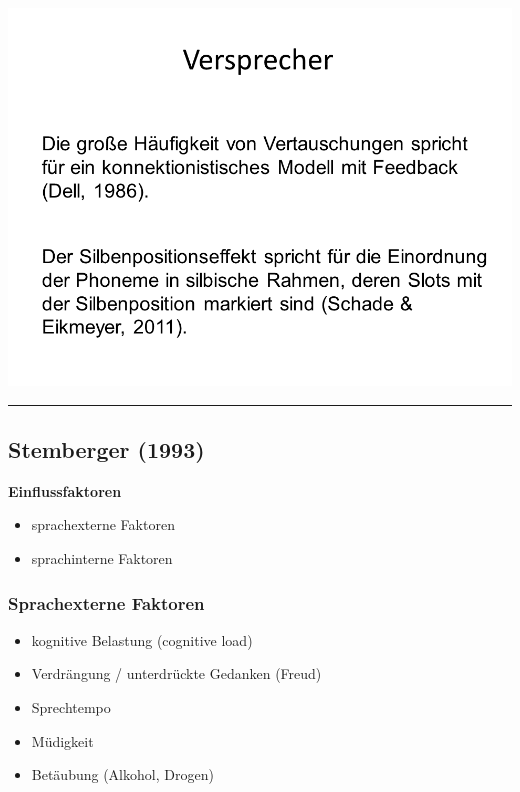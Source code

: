\documentclass[
  letterpaper,
]{scrbook}
\providecommand{\tightlist}{%
  \setlength{\itemsep}{0pt}\setlength{\parskip}{0pt}}\usepackage{longtable,booktabs,array}
\begin{document}
\includegraphics[width=1\textwidth,height=\textheight]{./pictures/Versprechertypen_15.PNG}

\begin{center}\rule{0.5\linewidth}{0.5pt}\end{center}

\hypertarget{stemberger-1993}{%
\subsection{Stemberger (1993)}\label{stemberger-1993}}

\textbf{Einflussfaktoren}

\begin{itemize}
\tightlist
\item
  sprachexterne Faktoren
\item
  sprachinterne Faktoren
\end{itemize}

\hypertarget{sprachexterne-faktoren}{%
\subsubsection{Sprachexterne Faktoren}\label{sprachexterne-faktoren}}

\begin{itemize}
\tightlist
\item
  kognitive Belastung (cognitive load)
\item
  Verdrängung / unterdrückte Gedanken (Freud)
\item
  Sprechtempo
\item
  Müdigkeit
\item
  Betäubung (Alkohol, Drogen)
\end{itemize}
\end{document}
